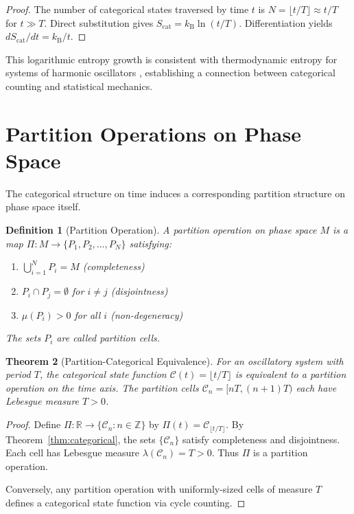 \documentclass[twocolumn,10pt,a4paper]{article}
\newtheorem{theorem}{Theorem}[section]
\newtheorem{definition}[theorem]{Definition}
\newcommand{\R}{\mathbb{R}}
\newcommand{\Z}{\mathbb{Z}}
\newcommand{\kB}{k_{\text{B}}}
\begin{document}
\begin{proof}
The number of categorical states traversed by time $t$ is $N = \lfloor t/T \rfloor \approx t/T$ for $t \gg T$. Direct substitution gives $S_{\text{cat}} = \kB \ln(t/T)$. Differentiation yields $dS_{\text{cat}}/dt = \kB/t$.
\end{proof}

This logarithmic entropy growth is consistent with thermodynamic entropy for systems of harmonic oscillators \citep{boltzmann1877beziehung, gibbs1902elementary}, establishing a connection between categorical counting and statistical mechanics.

\section{Partition Operations on Phase Space}
\label{sec:partitions}

The categorical structure on time induces a corresponding partition structure on phase space itself.

\begin{definition}[Partition Operation]
A \emph{partition operation} on phase space $M$ is a map $\Pi: M \to \{P_1, P_2, \ldots, P_N\}$ satisfying:
\begin{enumerate}[label=(\roman*)]
    \item $\bigcup_{i=1}^N P_i = M$ (completeness)
    \item $P_i \cap P_j = \emptyset$ for $i \neq j$ (disjointness)
    \item $\mu(P_i) > 0$ for all $i$ (non-degeneracy)
\end{enumerate}
The sets $P_i$ are called \emph{partition cells}.
\end{definition}

\begin{theorem}[Partition-Categorical Equivalence]
\label{thm:part_cat}
For an oscillatory system with period $T$, the categorical state function $\mathcal{C}(t) = \lfloor t/T \rfloor$ is equivalent to a partition operation on the time axis. The partition cells $\mathcal{C}_n = [nT, (n+1)T)$ each have Lebesgue measure $T > 0$.
\end{theorem}

\begin{proof}
Define $\Pi: \R \to \{\mathcal{C}_n : n \in \Z\}$ by $\Pi(t) = \mathcal{C}_{\lfloor t/T \rfloor}$. By Theorem~\ref{thm:categorical}, the sets $\{\mathcal{C}_n\}$ satisfy completeness and disjointness. Each cell has Lebesgue measure $\lambda(\mathcal{C}_n) = T > 0$. Thus $\Pi$ is a partition operation.

Conversely, any partition operation with uniformly-sized cells of measure $T$ defines a categorical state function via cycle counting.
\end{proof}
\end{document}
